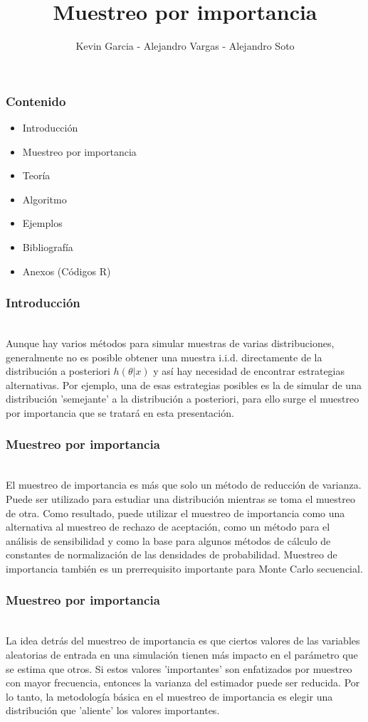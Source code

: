 \documentclass[12pt]{beamer}
\author{Kevin Garcia - Alejandro Vargas - Alejandro Soto}
\title{Muestreo por importancia}
\begin{document}
\begin{frame}
\titlepage
\end{frame}

\begin{frame}
\frametitle{Contenido}
\begin{itemize}
\item Introducción
\item Muestreo por importancia
\item Teoría
\item Algoritmo
\item Ejemplos
\item Bibliografía
\item Anexos (Códigos R)
\end{itemize}
\end{frame}

\begin{frame}
\frametitle{Introducción}
~\\Aunque hay varios métodos para simular muestras de varias distribuciones, generalmente no es posible obtener una muestra i.i.d. directamente de la distribución a posteriori $h(\theta|x)$ y así hay necesidad de encontrar estrategias alternativas. Por ejemplo, una de esas estrategias posibles es la de simular de una distribución 'semejante' a la distribución a posteriori, para ello surge el muestreo por importancia que se tratará en esta presentación.
\end{frame}

\begin{frame}
\frametitle{Muestreo por importancia}
~\\El muestreo de importancia es más que solo un método de reducción de varianza. Puede
ser utilizado para estudiar una distribución mientras se toma el muestreo de otra. Como resultado,
puede utilizar el muestreo de importancia como una alternativa al muestreo de rechazo de aceptación, como un método para el análisis de sensibilidad y como la base para algunos métodos de cálculo de constantes de normalización de las densidades de probabilidad. Muestreo de importancia
también es un prerrequisito importante para Monte Carlo secuencial.
\end{frame}

\begin{frame}
\frametitle{Muestreo por importancia}
~\\La idea detrás del muestreo de importancia es que ciertos valores de las variables aleatorias de entrada en una simulación tienen más impacto en el parámetro que se estima que otros. Si estos valores 'importantes' son enfatizados por muestreo con mayor frecuencia, entonces la varianza del estimador puede ser reducida. Por lo tanto, la metodología básica en el muestreo de importancia es elegir una distribución que 'aliente' los valores importantes.
\end{frame}
\end{document}
